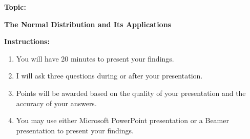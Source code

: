 \documentclass[11pt]{book}
\begin{document}
\thispagestyle{fancy}
\vspace{0.5in}

\textbf{Topic:}

\begin{center}
    \large{\textbf{The Normal Distribution and Its Applications}}
\end{center}


\textbf{Instructions:}

\begin{enumerate}
    \item You will have 20 minutes to present your findings.
    \item I will ask three questions during or after your presentation.
    \item Points will be awarded based on the quality of your presentation and the accuracy of your answers.
    \item You may use either Microsoft PowerPoint presentation or a Beamer presentation to present your findings.
\end{enumerate}
\end{document}
